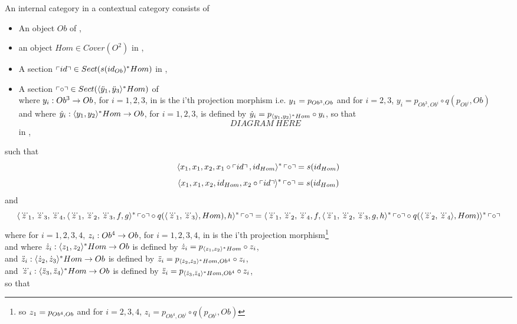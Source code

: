 \newcommand{\compmorph}{\text{`$\circ$\kern-2pt'}}%

\newcommand{\ccplaceholder}{\rule[-0.2cm]{0cm}{0.6cm}\kern0.2cm}
\newcommand{\rightend}[1] { \kern-0.2cm\Rnode{#1} {\ccplaceholder} }

\begin{lemma}
An internal category in a contextual category \catcw consists of
\begin{itemize}
\item An object $Ob$ of \catc,
\item an object $Hom \in Cover(O^2)$ in \catc,
\item A section $\left\ulcorner id\right\urcorner \in Sect(s(id_{Ob})^*Hom)$ in \catc, 
\item A section $\left\ulcorner\circ\right\urcorner \in Sect(\langle\ddot y_1,\ddot y_3\rangle^*Hom) $ of \catc \\ 
where $y_i: Ob^3 \rightarrow Ob$, for $i=1,2,3$,  in \catcw is the i'th projection morphism  i.e. $y_1 = p_{Ob^3,Ob}$ 
and  for $i = 2,3$,   $y_i = p_{Ob^3,Ob^i}\circ q(p_{Ob^i},Ob)$ \\
and where   $\dot y_i : \langle y_1,y_2\rangle^*Hom \rightarrow Ob$, for $i = 1,2,3$, 
                                     is defined by $\dot y_i = p_{\langle y_1,y_2\rangle^*Hom}\circ y_i$, so that
\begin{equation*}
DIAGRAM\ HERE
\end{equation*}																		
in \catc,
																		
\end{itemize}
such that
\begin{equation}
\label{leftidentityaxiom}
\langle x_1,x_1,x_2,x_1\circ \left\ulcorner id\right\urcorner,id_{Hom}\rangle^*\left\ulcorner\circ\right\urcorner=s(id_{Hom})
\end{equation}
\begin{equation}
\label{rightidentityaxiom}
\langle x_1,x_1,x_2,id_{Hom},x_2\circ \left\ulcorner id\right\urcorner\rangle^*\left\ulcorner\circ\right\urcorner=s(id_{Hom})
\end{equation}
and
\begin{equation}
\label{associativityaxiom}
\langle\dddot z_1,\dddot z_3,\dddot z_4,\langle\dddot z_1,\dddot z_2,\dddot z_3,f,g\rangle^*\left\ulcorner\circ\right\urcorner \circ q(\langle\dddot z_1,\dddot z_3\rangle,Hom),h\rangle^*\left\ulcorner\circ\right\urcorner = \langle\dddot z_1,\dddot z_2,\dddot z_4,f,\langle\dddot z_1,\dddot z_2,\dddot z_3,g,h\rangle^*\left\ulcorner\circ\right\urcorner \circ q(\langle\dddot z_2,\dddot z_4\rangle,Hom)\rangle^*\left\ulcorner\circ\right\urcorner
\end{equation}
where for $i = 1, 2,3,4$, $z_i: Ob^4 \rightarrow Ob$, for $i=1,2,3,4$,  in \catcw is the i'th projection morphism\footnote{so $z_1 = p_{Ob^4,Ob}$ 
and  for $i = 2,3, 4$,   $z_i = p_{Ob^4,Ob^i}\circ q(p_{Ob^i},Ob)$} \\
and where   $\dot z_i : \langle z_1,z_2\rangle^*Hom \rightarrow Ob$
                                     is defined by $\dot z_i = p_{\langle z_1,z_2\rangle^*Hom}\circ z_i$,\\ 
and  $\ddot z_i : \langle\dot z_2,\dot z_3\rangle^*Hom \rightarrow Ob$ 
                                     is defined by $\ddot z_i = p_{\langle\dot z_2,\dot z_3\rangle^*Hom, Ob^4}\circ z_i$, \\ 
and $\dddot z_i : \langle\ddot z_3,\ddot z_4\rangle^*Hom \rightarrow Ob$ 
                                     is defined by $\ddot z_i = p_{\langle\ddot z_3,\ddot z_4\rangle^*Hom, Ob^4}\circ z_i$, \\												
so that


\end{lemma}
